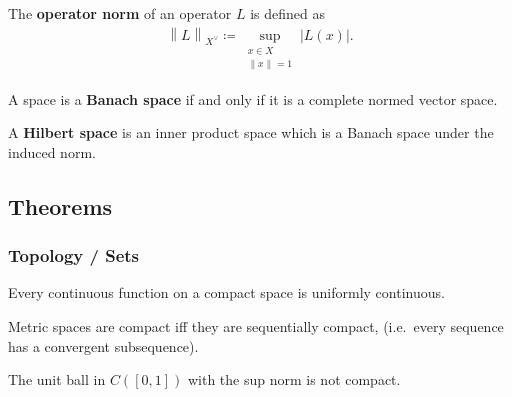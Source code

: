 \begin{definition}

The \textbf{operator norm} of an operator \(L\) is defined as
\begin{align*}
{\left\lVert {L} \right\rVert}_{X^\vee} \coloneqq\sup_{ \substack{x\in X \\ {\left\lVert {x} \right\rVert} = 1} } {\left\lvert {L(x)} \right\rvert}
.\end{align*}

\end{definition}

\begin{definition}

A space is a \textbf{Banach space} if and only if it is a complete
normed vector space.

\end{definition}

\begin{definition}

A \textbf{Hilbert space} is an inner product space which is a Banach
space under the induced norm.

\end{definition}

\hypertarget{theorems}{%
\subsection{Theorems}\label{theorems}}

\hypertarget{topology-sets}{%
\subsubsection{Topology / Sets}\label{topology-sets}}

\begin{theorem}

Every continuous function on a compact space is uniformly continuous.

\end{theorem}

\begin{proposition}

Metric spaces are compact iff they are sequentially compact, (i.e.~every
sequence has a convergent subsequence).

\end{proposition}

\begin{proposition}

The unit ball in \(C([0, 1])\) with the sup norm is not compact.

\end{proposition}


